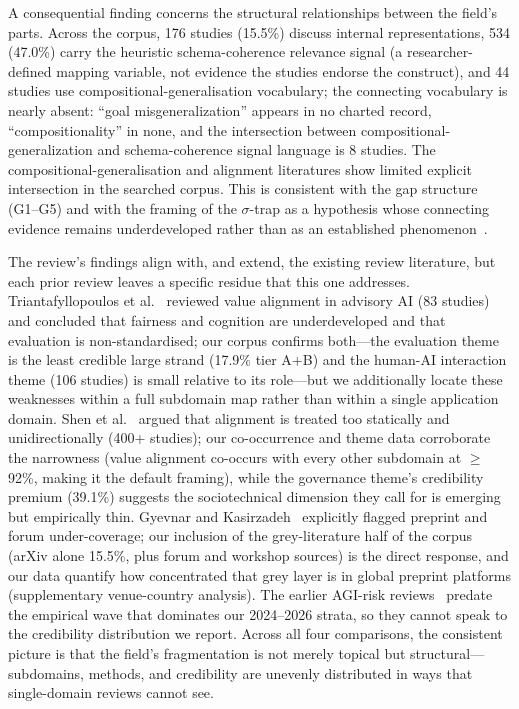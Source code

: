 A consequential finding concerns the structural relationships between the field's parts. Across the corpus, 176 studies (15.5\%) discuss internal representations, 534 (47.0\%) carry the heuristic schema-coherence relevance signal (a researcher-defined mapping variable, not evidence the studies endorse the construct), and 44 studies use compositional-generalisation vocabulary; the connecting vocabulary is nearly absent: ``goal misgeneralization'' appears in no charted record, ``compositionality'' in none, and the intersection between compositional-generalization and schema-coherence signal language is 8 studies. The compositional-generalisation and alignment literatures show limited explicit intersection in the searched corpus. This is consistent with the gap structure (G1--G5) and with the framing of the $\sigma$-trap as a hypothesis whose connecting evidence remains underdeveloped rather than as an established phenomenon~\cite{amsyar2026sigma}.

The review's findings align with, and extend, the existing review literature, but each prior review leaves a specific residue that this one addresses. Triantafyllopoulos et al.~\cite{triantafyllopoulos2026value} reviewed value alignment in advisory AI (83 studies) and concluded that fairness and cognition are underdeveloped and that evaluation is non-standardised; our corpus confirms both---the evaluation theme is the least credible large strand (17.9\% tier A+B) and the human-AI interaction theme (106 studies) is small relative to its role---but we additionally locate these weaknesses within a full subdomain map rather than within a single application domain. Shen et al.~\cite{shen2024bidirectional} argued that alignment is treated too statically and unidirectionally (400+ studies); our co-occurrence and theme data corroborate the narrowness (value alignment co-occurs with every other subdomain at $\geq$ 92\%, making it the default framing), while the governance theme's credibility premium (39.1\%) suggests the sociotechnical dimension they call for is emerging but empirically thin. Gyevnar and Kasirzadeh~\cite{gyevnar2025aisafety} explicitly flagged preprint and forum under-coverage; our inclusion of the grey-literature half of the corpus (arXiv alone 15.5\%, plus forum and workshop sources) is the direct response, and our data quantify how concentrated that grey layer is in global preprint platforms (supplementary venue-country analysis). The earlier AGI-risk reviews~\cite{hendrycks2023overview} predate the empirical wave that dominates our 2024--2026 strata, so they cannot speak to the credibility distribution we report. Across all four comparisons, the consistent picture is that the field's fragmentation is not merely topical but structural---subdomains, methods, and credibility are unevenly distributed in ways that single-domain reviews cannot see.

